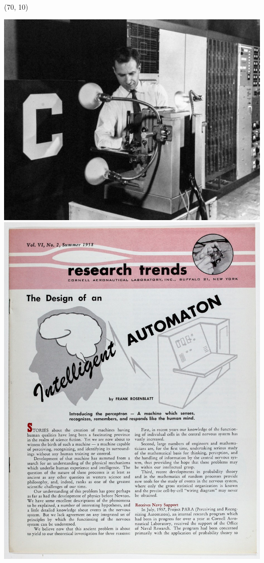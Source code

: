 \begin{frame}
  \begin{textblock}{30}(70, 10)
    \begin{center}
      \includegraphics[width=\textwidth]{img/MLP.jpg}
      \includegraphics[width=\textwidth]{img/MLP_Cover.jpg}
    \end{center}
  \end{textblock}
\end{frame}


